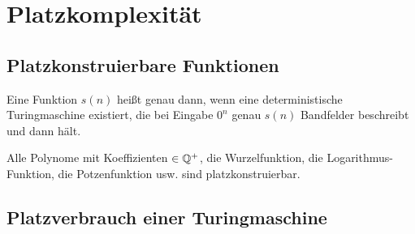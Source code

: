 




\chapter{Platzkomplexität} %
\label{cha:platzkomplexitaet}
    



\section{Platzkonstruierbare Funktionen}


\begin{definition}
    
    Eine Funktion $s(n)$ heißt  genau dann, wenn eine deterministische Turingmaschine existiert, die bei Eingabe $0^n$ genau $s(n)$ Bandfelder beschreibt und dann hält.

\end{definition}

\begin{beispiel}

    Alle Polynome mit Koeffizienten $\in \mathbb{Q}^+$, die Wurzelfunktion, die Logarithmus-Funktion, die Potzenfunktion usw. sind platzkonstruierbar.
    
\end{beispiel}




\section{Platzverbrauch einer Turingmaschine}

